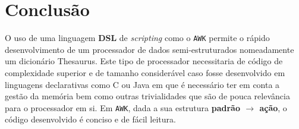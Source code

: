 \documentclass{llncs}
\begin{document}
\section{Conclusão}
O uso de uma linguagem \textbf{DSL} de \textit{scripting} como o \texttt{AWK} permite o rápido desenvolvimento de um processador de dados semi-estruturados nomeadamente um dicionário Thesaurus. Este tipo de processador necessitaria de código de complexidade superior e de tamanho considerável caso fosse desenvolvido em linguagens declarativas como C ou Java em que é necessário ter em conta a gestão da memória bem como outras trivialidades que são de pouca relevância para o processador em si. Em \texttt{AWK}, dada a sua estrutura \textbf{padrão $\to$ ação}, o código desenvolvido é conciso e de fácil leitura.
\end{document}
